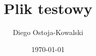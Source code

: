 \documentclass{article}
\begin{document}
\title{Plik testowy}
\author{Diego Ostoja-Kowalski}
\date{\today}

\maketitle
\end{document}
